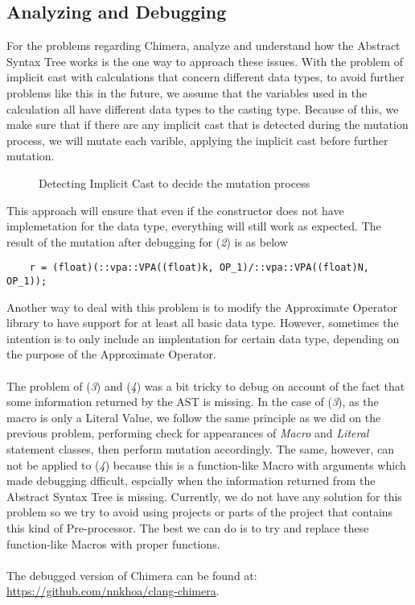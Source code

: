 \subsection{Analyzing and Debugging}

For the problems regarding Chimera, analyze and understand how the Abstract Syntax Tree works is the one way to approach these issues. With the problem of implicit cast with calculations that concern different data types, to avoid further problems like this in the future, we assume that the variables used in the calculation all have different data types to the casting type. Because of this, we make sure that if there are any implicit cast that is detected during the mutation process, we will mutate each varible, applying the implicit cast before further mutation. 
\begin{figure}[H]
\centering
\caption{Detecting Implicit Cast to decide the mutation process}
\end{figure}
This approach will ensure that even if the constructor does not have implemetation for the data type, everything will still work as expected. The result of the mutation after debugging for (\textit{2}) is as below
\begin{verbatim}
	r = (float)(::vpa::VPA((float)k, OP_1)/::vpa::VPA((float)N, OP_1));
\end{verbatim}
Another way to deal with this problem is to modify the Approximate Operator library to have support for at least all basic data type. However, sometimes the intention is to only include an implentation for certain data type, depending on the purpose of the Approximate Operator. \\
~\\
The problem of (\textit{3}) and (\textit{4}) was a bit tricky to debug on account of the fact that some information returned by the AST is missing. In the case of (\textit{3}), as the macro is only a Literal Value, we follow the same principle as we did on the previous problem, performing check for appearances of \textit{Macro} and \textit{Literal} statement classes, then perform mutation accordingly. The same, however, can not be applied to (\textit{4}) because this is a function-like Macro with arguments which made debugging dfficult, espcially when the information returned from the Abstract Syntax Tree is missing. Currently, we do not have any solution for this problem so we try to avoid using projects or parts of the project that contains this kind of Pre-processor. The best we can do is to try and replace these function-like Macros with proper functions. \\
~\\
The debugged version of Chimera can be found at: \url{https://github.com/nnkhoa/clang-chimera}.\\

